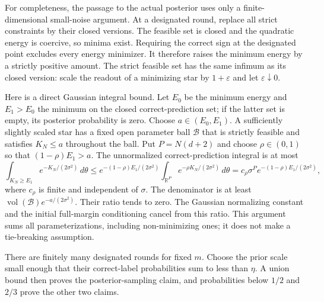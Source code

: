 \documentclass[11pt]{article}
\theoremstyle{remark}\newtheorem{remark}[theorem]{Remark}
\newcommand{\R}{\mathbb R}\newcommand{\E}{\mathbb E}\newcommand{\Prb}{\mathbb P}
\begin{document}
For completeness, the passage to the actual posterior uses only a
finite-dimensional small-noise argument. At a designated round, replace
all strict constraints by their closed versions. The feasible set is
closed and the quadratic energy is coercive, so minima exist. Requiring
the correct sign at the designated point excludes every energy minimizer.
It therefore raises the minimum energy by a strictly positive amount.
The strict feasible set has the same infimum as its closed version:
scale the readout of a minimizing star by $1+\varepsilon$ and let
$\varepsilon\downarrow0$.

Here is a direct Gaussian integral bound. Let $E_0$ be the minimum energy
and $E_1>E_0$ the minimum on the closed correct-prediction set; if the
latter set is empty, its posterior probability is zero. Choose
$a\in(E_0,E_1)$. A sufficiently slightly scaled star has a fixed open
parameter ball $\mathcal B$ that is strictly feasible and satisfies
$K_N\le a$ throughout the ball. Put $P=N(d+2)$ and choose $\rho\in(0,1)$
so that $(1-\rho)E_1>a$. The unnormalized correct-prediction integral is
at most
\[
 \int_{K_N\ge E_1}e^{-K_N/(2\sigma^2)}\,d\theta
 \le e^{-(1-\rho)E_1/(2\sigma^2)}
       \int_{\R^P}e^{-\rho K_N/(2\sigma^2)}\,d\theta
 =c_\rho\sigma^P e^{-(1-\rho)E_1/(2\sigma^2)},
\]
where $c_\rho$ is finite and independent of $\sigma$. The denominator is
at least $\operatorname{vol}(\mathcal B)e^{-a/(2\sigma^2)}$.
Their ratio tends to zero. The Gaussian normalizing constant and the
initial full-margin conditioning cancel from this ratio. This argument
sums all parameterizations, including non-minimizing ones; it does not
make a tie-breaking assumption.

There are finitely many designated rounds for fixed $m$. Choose the prior
scale small enough that their correct-label probabilities sum to less
than $\eta$. A union bound then proves the posterior-sampling claim, and
probabilities below $1/2$ and $2/3$ prove the other two claims.
\end{document}
